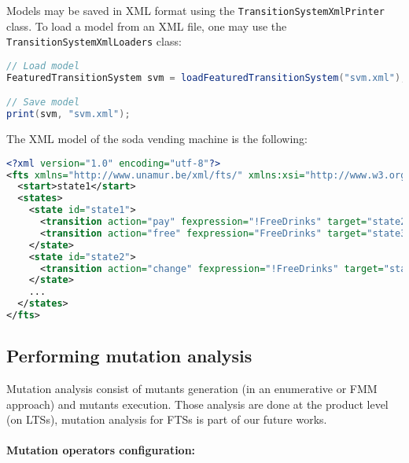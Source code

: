 Models may be saved in XML format using the \texttt{Tran\-si\-tion\-Sy\-stem\-Xml\-Prin\-ter} class. To load a model from an XML file, one may use the \texttt{Tran\-si\-tion\-Sys\-tem\-Xml\-Loa\-ders} class:
%
\begin{lstlisting}[language=Java,frame=single,numbers=none]
// Load model
FeaturedTransitionSystem svm = loadFeaturedTransitionSystem("svm.xml");

// Save model
print(svm, "svm.xml");
\end{lstlisting}
%
The XML model of the soda vending machine is the following:
%
\begin{lstlisting}[language=XML,frame=single,numbers=none]
<?xml version="1.0" encoding="utf-8"?>
<fts xmlns="http://www.unamur.be/xml/fts/" xmlns:xsi="http://www.w3.org/2001/XMLSchema-instance">
  <start>state1</start>
  <states>
    <state id="state1">
      <transition action="pay" fexpression="!FreeDrinks" target="state2"/>
      <transition action="free" fexpression="FreeDrinks" target="state3"/>
    </state>
    <state id="state2">
      <transition action="change" fexpression="!FreeDrinks" target="state3"/>
    </state>
    ...
  </states>
</fts>
\end{lstlisting}

\subsection{Performing mutation analysis}

Mutation analysis consist of mutants generation (in an enumerative or \gls{FMM} approach) and mutants execution. Those analysis are done at the product level (on \glspl{LTS}), mutation analysis for \glspl{FTS} is part of our future works. 

\paragraph{Mutation operators configuration:}

